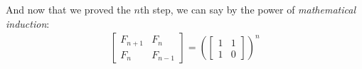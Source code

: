 \documentclass[12pt]{article}
\begin{document}
And now that we proved the $n$th step, we can say by the power of \textit{mathematical induction}:
\begin{gather*}
    \begin{bmatrix}
        F_{n+1} & F_{n} \\
        F_{n} & F_{n-1}
    \end{bmatrix}
    =
    \left(\begin{bmatrix}
    1 & 1 \\
    1 & 0
    \end{bmatrix}\right)^{n}
\end{gather*}
\end{document}
